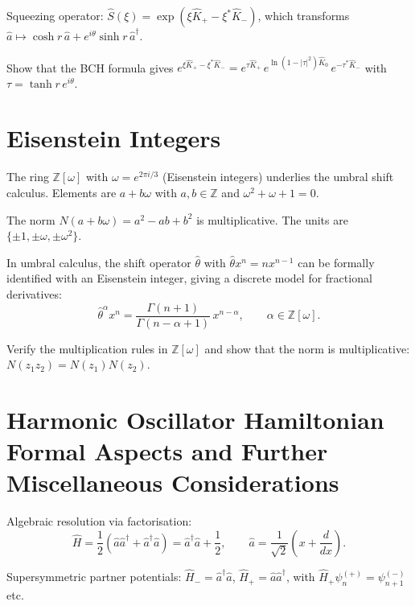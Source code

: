 Squeezing operator:
$\hat S(\xi)=\exp(\xi\hat K_+ - \xi^*\hat K_-)$,
which transforms $\hat a\mapsto\cosh r\,\hat a + e^{i\theta}\sinh r\,\hat a^\dagger$.

\begin{exercise}
Show that the BCH formula gives
$e^{\xi\hat K_+-\xi^*\hat K_-}=e^{\tau\hat K_+}\,e^{\ln(1-|\tau|^2)\hat K_0}\,e^{-\tau^*\hat K_-}$
with $\tau = \tanh r\,e^{i\theta}$.
\end{exercise}

\section{Eisenstein Integers}

The ring $\mathbb Z[\omega]$ with $\omega=e^{2\pi i/3}$ (Eisenstein integers)
underlies the umbral shift calculus. Elements are $a+b\omega$ with
$a,b\in\mathbb Z$ and $\omega^2+\omega+1=0$.

The norm $N(a+b\omega)=a^2-ab+b^2$ is multiplicative.
The units are $\{\pm1,\pm\omega,\pm\omega^2\}$.

In umbral calculus, the shift operator $\hat\theta$ with $\hat\theta x^n = n x^{n-1}$
can be formally identified with an Eisenstein integer, giving a discrete
model for fractional derivatives:
\begin{equation}
\hat\theta^\alpha x^n = \frac{\Gamma(n+1)}{\Gamma(n-\alpha+1)}\,x^{n-\alpha},
\qquad \alpha\in\mathbb Z[\omega].
\label{eq:7.5.1}
\end{equation}

\begin{exercise}
Verify the multiplication rules in $\mathbb Z[\omega]$ and show that the norm
is multiplicative: $N(z_1z_2)=N(z_1)N(z_2)$.
\end{exercise}

\section{Harmonic Oscillator Hamiltonian Formal Aspects and Further Miscellaneous Considerations}

Algebraic resolution via factorisation:
\begin{equation}
\hat H = \frac12(\hat a\hat a^\dagger + \hat a^\dagger\hat a)
= \hat a^\dagger\hat a + \frac12,
\qquad \hat a = \frac{1}{\sqrt{2}}\!\left(x+\frac{d}{dx}\right).
\label{eq:7.6.1}
\end{equation}

Supersymmetric partner potentials:
$\hat H_-=\hat a^\dagger\hat a$, $\hat H_+=\hat a\hat a^\dagger$,
with $\hat H_+\psi_n^{(+)}=\psi_{n+1}^{(-)}$ etc.

